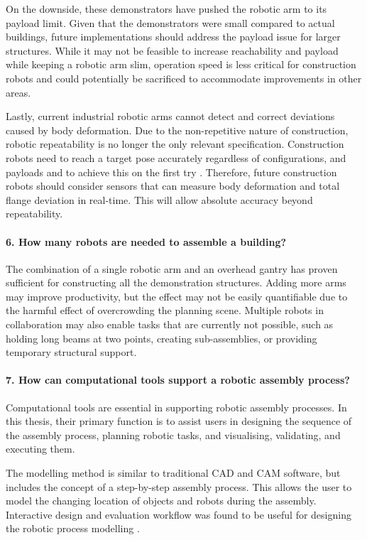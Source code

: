 On the downside, these demonstrators have pushed the robotic arm to its payload limit. Given that the demonstrators were small compared to actual buildings, future implementations should address the payload issue for larger structures. While it may not be feasible to increase reachability and payload while keeping a robotic arm slim, operation speed is less critical for construction robots and could potentially be sacrificed to accommodate improvements in other areas.

Lastly, current industrial robotic arms cannot detect and correct deviations caused by body deformation. Due to the non-repetitive nature of construction, robotic repeatability is no longer the only relevant specification. Construction robots need to reach a target pose accurately regardless of configurations, and payloads and to achieve this on the first try . Therefore, future construction robots should consider sensors that can measure body deformation and total flange deviation in real-time. This will allow absolute accuracy beyond repeatability. 

\paragraph{6. How many robots are needed to assemble a building?}

The combination of a single robotic arm and an overhead gantry has proven sufficient for constructing all the demonstration structures. Adding more arms may improve productivity, but the effect may not be easily quantifiable due to the harmful effect of overcrowding the planning scene. Multiple robots in collaboration may also enable tasks that are currently not possible, such as holding long beams at two points, creating sub-assemblies, or providing temporary structural support.

\paragraph{7. How can computational tools support a robotic assembly process?}

Computational tools are essential in supporting robotic assembly processes. In this thesis, their primary function is to assist users in designing the sequence of the assembly process, planning robotic tasks, and visualising, validating, and executing them. 

The modelling method is similar to traditional CAD and CAM software, but includes the concept of a step-by-step assembly process. This allows the user to model the changing location of objects and robots during the assembly. Interactive design and evaluation workflow was found to be useful for designing the robotic process modelling .

